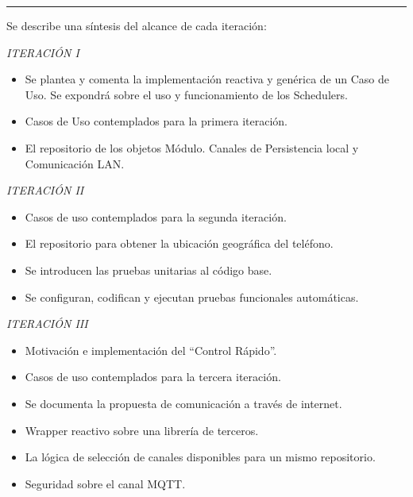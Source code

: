 \begin{multicols}{2}
\begin{Figure}
		\rule{\linewidth}{1pt}
		\label{fig:casosusoiter}
	\end{Figure}
	
	\columnbreak
	Se describe una síntesis del alcance de cada iteración:
	{ \small
	
	\emph{ITERACIÓN I} 
	\begin{itemize}
		\item Se plantea y comenta la implementación reactiva y genérica de un Caso de Uso. Se expondrá sobre el uso y funcionamiento de los Schedulers.
		\item Casos de Uso contemplados para la primera iteración.
		\item El repositorio de los objetos Módulo. Canales de Persistencia local y Comunicación LAN.
	\end{itemize}
	
	
	\emph{ITERACIÓN II}
	\begin{itemize}
		\item Casos de uso contemplados para la segunda iteración.
		\item El repositorio para obtener la ubicación geográfica del teléfono.
		\item Se introducen las pruebas unitarias al código base.
		\item Se configuran, codifican y ejecutan pruebas funcionales automáticas.
	\end{itemize}

	\emph{ITERACIÓN III}
	\begin{itemize}
		\item Motivación e implementación del ``Control Rápido''.
		\item Casos de uso contemplados para la tercera iteración.
		\item Se documenta la propuesta de comunicación a través de internet.
		\item Wrapper reactivo sobre una librería de terceros.
		\item La lógica de selección de canales disponibles para un mismo repositorio.
		\item Seguridad sobre el canal MQTT.	
	\end{itemize}
	}
\end{multicols}





